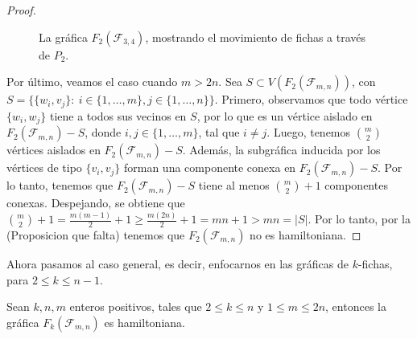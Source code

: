 \begin{proof}
\begin{figure}[ht!]
    
        \caption{La gr\'afica $F_2(\mathcal{F}_{3,4})$, mostrando el movimiento
        de fichas a trav\'es de $P_2$.}
    \label{fig:exe-tray-n-m}     
    \end{figure}

Por \'ultimo, veamos el caso cuando $m>2n$. Sea $S \subset
V(F_2(\mathcal{F}_{m,n}))$, con $S=\{\{w_i,v_j\} \colon\ i \in
\{1,\dots,m\},j\in\{1,\dots,n\}\}$. Primero, observamos que todo v\'ertice
$\{w_i,w_j\}$ tiene a todos sus vecinos en $S$, por lo que es un v\'ertice
aislado en $F_2(\mathcal{F}_{m,n})-S$, donde $i,j \in \{1,\dots,m\}$, tal que $i
\neq j$. Luego, tenemos $\binom{m}{2}$ v\'ertices aislados en
$F_2(\mathcal{F}_{m,n})-S$. Adem\'as, la subgr\'afica inducida por los
v\'ertices de tipo $\{v_i,v_j\}$ forman una componente conexa en
$F_2(\mathcal{F}_{m,n})-S$. Por lo tanto, tenemos que $F_2(\mathcal{F}_{m,n})-S$
tiene al menos $\binom{m}{2} + 1$ componentes conexas. Despejando, se obtiene
que $\binom{m}{2} + 1 = \frac{m(m-1)}{2} + 1 \geq \frac{m(2n)}{2} + 1 = mn + 1 >
mn = |S|$. Por lo tanto, por la (Proposicion que falta) tenemos que
$F_2(\mathcal{F}_{m,n})$ no es hamiltoniana.

\end{proof}

Ahora pasamos al caso general, es decir, enfocarnos en las gr\'aficas de
$k$-fichas, para $2 \leq k \leq n-1$.

\begin{teorema}
\label{teo:TokGenerFan}
    Sean $k, n, m$ enteros positivos, tales que $2 \leq k \leq n$ y $1 \leq m
       \leq 2n$, entonces la gr\'afica $F_k(\mathcal{F}_{m,n})$ es hamiltoniana.
\end{teorema}

